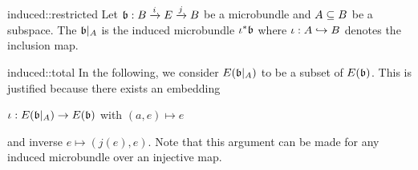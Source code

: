 \begin{myexample}{induced::restricted}    
    Let $\bundledef{\bb}{B}{E}{i}{j}$ be a microbundle and $A \sub B$ be a subspace.
    The  $\bb\restr{A}$ is the induced microbundle $\ind{\iota}\bb$
    where $\iota: A \incl B$ denotes the inclusion map.
\end{myexample}

\begin{myremark}{induced::total}
    In the following, we consider $E(\bb\restr{A})$ to be a subset of $E(\bb)$.
    This is justified because there exists an embedding
    \begin{center}
        $\iota: E(\bb\restr{A}) \to E(\bb)$ with $(a, e) \mapsto e$
    \end{center}
    and inverse $e \mapsto (j(e), e)$.
    Note that this argument can be made for any induced microbundle over an injective map.
\end{myremark}
